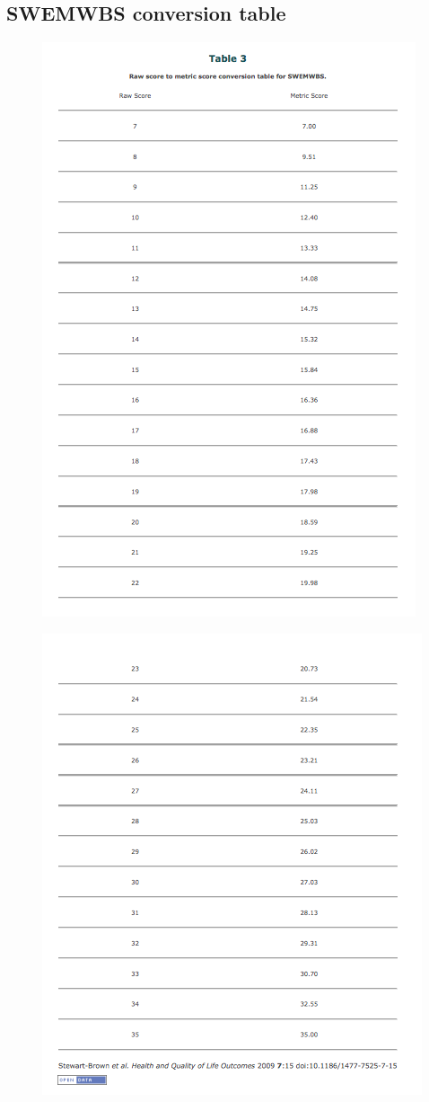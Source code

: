 \documentclass[11pt,openright,a4paper]{report}
\begin{document}
\printbibliography

\begin{appendices}
\section{SWEMWBS conversion table} \label{SWEMWBS conversion table}
\begin{figure}[ht]
  \centering
  \includegraphics[width =.7\textwidth]{i/swemwbsconversiontable1.png}
  \label{swemwbsconversiontable}
\end{figure}

\newpage
\begin{figure}[ht]
  \centering
  \includegraphics[width =.7\textwidth]{i/swemwbsconversiontable2.png}
\end{figure}


\end{appendices}
\end{document}
